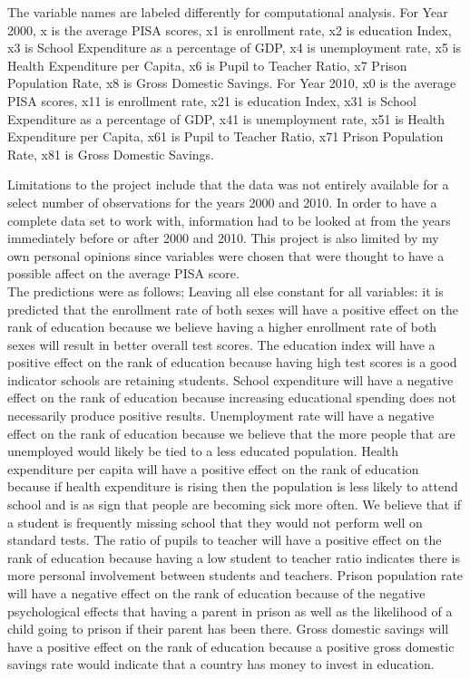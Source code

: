 \documentclass{article}
\begin{document}
The variable names are labeled differently for computational analysis. For Year 2000, x is the average PISA scores, x1 is enrollment rate, x2 is education Index, x3 is School Expenditure as a percentage of GDP, x4 is unemployment rate, x5 is Health Expenditure per Capita, x6 is Pupil to Teacher Ratio, x7 Prison Population Rate, x8 is Gross Domestic Savings. For Year 2010, x0 is the average PISA scores, x11 is enrollment rate, x21 is education Index, x31 is School Expenditure as a percentage of GDP, x41 is unemployment rate, x51 is Health Expenditure per Capita, x61 is Pupil to Teacher Ratio, x71 Prison Population Rate, x81 is Gross Domestic Savings. 

Limitations to the project include that the data was not entirely available for a select number of observations for the years 2000 and 2010. In order to have a complete data set to work with, information had to be looked at from the years immediately before or after 2000 and 2010. This project is also limited by my own personal opinions since variables were chosen that were thought to have a possible affect on the average PISA score.\\

The predictions were as follows; Leaving all else constant for all variables: it is predicted that the enrollment rate of both sexes will have a positive effect on the rank of education because we believe having a higher enrollment rate of both sexes will result in better overall test scores. The education index will have a positive effect on the rank of education because having high test scores is a good indicator schools are retaining students. School expenditure will have a negative effect on the rank of education because increasing educational spending does not necessarily produce positive results. Unemployment rate will have a negative effect on the rank of education because we believe that the more people that are unemployed would likely be tied to a less educated population.  Health expenditure per capita will have a positive effect on the rank of education because if health expenditure is rising then the population is less likely to attend school and is as sign that people are becoming sick more often. We believe that if a student is frequently missing school that they would not perform well on standard tests. The ratio of pupils to teacher will have a positive effect on the rank of education because having a low student to teacher ratio indicates there is more personal involvement between students and teachers. Prison population rate will have a negative effect on the rank of education because of the negative psychological effects that having a parent in prison as well as the likelihood of a child going to prison if their parent has been there. Gross domestic savings will have a positive effect on the rank of education because a positive gross domestic savings rate would indicate that a country has money to invest in education.
\end{document}
